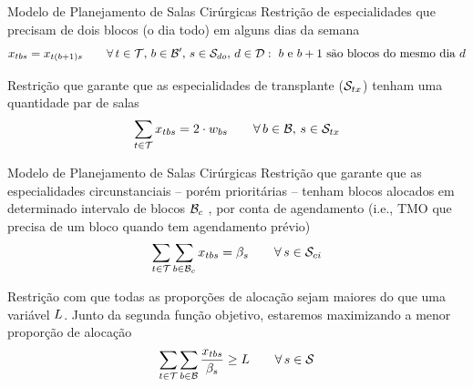 \documentclass[10pt]{beamer}
\begin{document}
\begin{frame}{Modelo de Planejamento de Salas Cirúrgicas}
    Restrição de especialidades que precisam de dois blocos (o dia todo) em alguns dias da semana
    \begin{equation}
    \label{eq:m2-10}
        x_{tbs} = x_{t(b+1)s} \hspace{2em} \forall\, t \in \mathcal{T},\, b \in \mathcal{B'},\,s \in \mathcal{S}_{do},\, d \in \mathcal{D} : \text{ $b$ e $b+1$ são blocos do mesmo dia $d$}
    \end{equation}
    
    Restrição que garante que as especialidades de transplante ($\mathcal{S}_{tx}$) tenham uma quantidade par de salas
    \begin{equation}
    \label{eq:m2-11}
        \sum_{t \in \mathcal{T}} x_{tbs} = 2 \cdot w_{bs} \hspace{2em} \forall\, b \in \mathcal{B},\, s \in \mathcal{S}_{tx}
    \end{equation}
\end{frame}


\begin{frame}{Modelo de Planejamento de Salas Cirúrgicas}
    Restrição que garante que as especialidades circunstanciais -- porém prioritárias -- tenham blocos alocados em determinado intervalo de blocos $\mathcal{B}_{c}$ , por conta de agendamento (i.e., TMO que precisa de um bloco quando tem agendamento prévio)
    \begin{equation}
    \label{eq:m2-12}
        \sum_{t \in \mathcal{T}} \sum_{b \in \mathcal{B}_{c}} x_{tbs} = \beta_{s} \hspace{2em} \forall\, s \in \mathcal{S}_{ci}
    \end{equation}
    
    Restrição com que todas as proporções de alocação sejam maiores do que uma variável $L$. Junto da segunda função objetivo, estaremos maximizando a menor proporção de alocação
    \begin{equation}
    \label{eq:m2-13}
         \sum_{t \in \mathcal{T}} \sum_{b \in \mathcal{B}} \frac{x_{tbs}}{\beta_{s}} \geq L \hspace{2em} \forall\, s \in \mathcal{S}
    \end{equation}
\end{frame}
\end{document}
